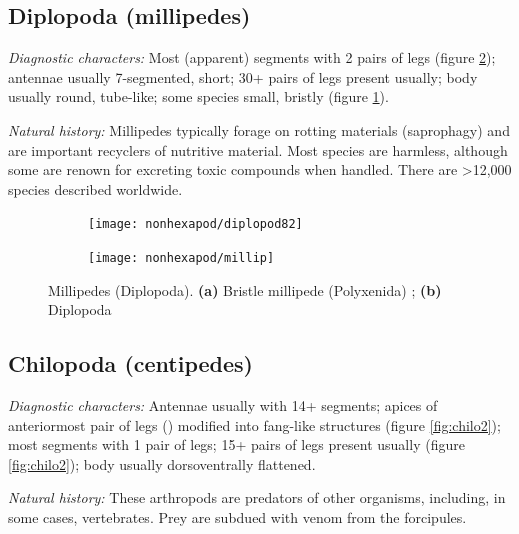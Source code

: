 \subsection{Diplopoda (millipedes)}
\noindent{}\textit{Diagnostic characters:} Most (apparent) segments with 2 pairs of legs (figure \ref{fig:diplop2}); antennae usually 7-segmented, short; 30+ pairs of legs present usually; body usually round, tube-like; some species small, bristly (figure \ref{fig:diplop1}).\vspace{3mm}

\noindent{}\textit{Natural history:} Millipedes typically forage on rotting materials (saprophagy) and are important recyclers of nutritive material. Most species are harmless, although some are renown for excreting toxic compounds when handled. There are \textgreater12,000 species described worldwide.\vspace{3mm}

\begin{figure}[ht!]
    \centering
    \begin{subfigure}[ht!]{0.27\textwidth}
        \texttt{[image: nonhexapod/diplopod82]}
        \caption{}
        \label{fig:diplop1}
    \end{subfigure}
    \hfill
    \begin{subfigure}[ht!]{0.65\textwidth}
        \texttt{[image: nonhexapod/millip]}
        \caption{}
        \label{fig:diplop2}
    \end{subfigure}
    \caption{Millipedes (Diplopoda). \textbf{(a)} Bristle millipede (Polyxenida) \citep[][Fig. 82]{bhlitem40112britmus}; \textbf{(b)} Diplopoda \citep{bhlitem94979diplopo}} \label{fig:diplopoda}
\end{figure}

\subsection{Chilopoda (centipedes)}
\noindent{}\textit{Diagnostic characters:} Antennae usually with 14+ segments; apices of anteriormost pair of legs () modified into fang-like structures (figure \ref{fig:chilo2}); most segments with 1 pair of legs; 15+ pairs of legs present usually (figure \ref{fig:chilo2}); body usually dorsoventrally flattened.\vspace{3mm}

\noindent{}\textit{Natural history:} These arthropods are predators of other organisms, including, in some cases, vertebrates. Prey are subdued with venom from the forcipules.\vspace{3mm}


